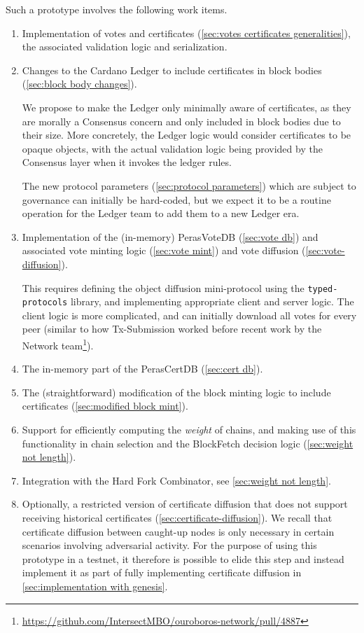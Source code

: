 Such a prototype involves the following work items.
\begin{enumerate}
\item\label{enumi:proto no certs:1}
  Implementation of votes and certificates (\cref{sec:votes certificates generalities}), the associated validation logic and serialization.
\item\label{enumi:proto no certs:2}
  Changes to the Cardano Ledger to include certificates in block bodies (\cref{sec:block body changes}).

  We propose to make the Ledger only minimally aware of certificates, as they are morally a Consensus concern and only included in block bodies due to their size.
  More concretely, the Ledger logic would consider certificates to be opaque objects, with the actual validation logic being provided by the Consensus layer when it invokes the ledger rules.

  The new protocol parameters (\cref{sec:protocol parameters}) which are subject to governance can initially be hard-coded, but we expect it to be a routine operation for the Ledger team to add them to a new Ledger era.
\item\label{enumi:proto no certs:3}
  Implementation of the (in-memory) PerasVoteDB (\cref{sec:vote db}) and associated vote minting logic (\cref{sec:vote mint}) and vote diffusion (\cref{sec:vote-diffusion}).

  This requires defining the object diffusion mini-protocol using the \texttt{typed-protocols} library, and implementing appropriate client and server logic.
  The client logic is more complicated, and can initially download all votes for every peer (similar to how Tx-Submission worked before recent work by the Network team\footnote{\url{https://github.com/IntersectMBO/ouroboros-network/pull/4887}}).
\item\label{enumi:proto no certs:4}
  The in-memory part of the PerasCertDB (\cref{sec:cert db}).
\item\label{enumi:proto no certs:5}
  The (straightforward) modification of the block minting logic to include certificates (\cref{sec:modified block mint}).
\item\label{enumi:proto no certs:6}
  Support for efficiently computing the \emph{weight} of chains, and making use of this functionality in chain selection and the BlockFetch decision logic (\cref{sec:weight not length}).
\item\label{enumi:proto no certs:7}
  Integration with the Hard Fork Combinator, see \cref{sec:weight not length}.
\item\label{enumi:proto no certs:8}
  Optionally, a restricted version of certificate diffusion that does not support receiving historical certificates (\cref{sec:certificate-diffusion}).
  We recall that certificate diffusion between caught-up nodes is only necessary in certain scenarios involving adversarial activity.
  For the purpose of using this prototype in a testnet, it therefore is possible to elide this step and instead implement it as part of fully implementing certificate diffusion in \cref{sec:implementation with genesis}.
\end{enumerate}

